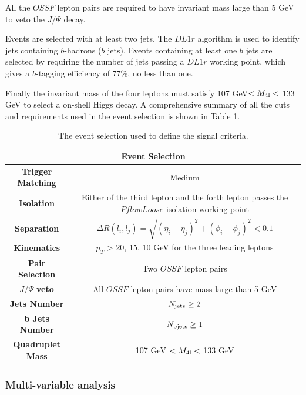 All the $OSSF$ lepton pairs are required to have invariant mass large than 5 GeV to veto the $J/\Psi$ decay.

Events are selected with at least two jets. The $DL1r$ algorithm is used to identify jets containing $b$-hadrons ($b$ jets). Events containing at least one $b$ jets are selected by requiring the number of jets passing a $DL1r$ working point, which gives a $b$-tagging efficiency of 77\%, no less than one.

Finally the invariant mass of the four leptons must satisfy 107 GeV$<M_{\rm 4l}<$ 133 GeV to select a on-shell Higgs decay. A comprehensive summary of all the cuts and requirements used in the event selection is shown in Table \ref{Tab.pre-selection}.

\begin{table}[H]
\begin{center}
\caption{The event selection used to define the signal criteria.}
\label{Tab.pre-selection}
\begin{tabular}{cc}
	\toprule
	\toprule	
	\multicolumn{2}{c}{\textbf{Event Selection}}\\
	\midrule
	\textbf{Trigger Matching}&Medium\\
	\midrule
	\textbf{Isolation}&\makecell[c]{Either of the third lepton and the forth lepton\\ passes the $PflowLoose$ isolation working point}\\
	\midrule
	\textbf{Separation}&$\Delta{R}(l_{i},l_{j})=\sqrt{(\eta_{i}-\eta_{j})^{2}+(\phi_{i}-\phi_{j})^{2}}<0.1$\\
	\midrule
	\textbf{Kinematics}&$p_{T}$ > 20, 15, 10 GeV for the three leading leptons\\
	\midrule
	\textbf{Pair Selection}&Two $OSSF$ lepton pairs\\
	\midrule
	\textbf{$J/\Psi$ veto}&All $OSSF$ lepton pairs have mass large than 5 GeV\\
	\midrule
	\textbf{Jets Number}&$N_{\rm jets}\ge{2}$\\
	\midrule
	\textbf{b Jets Number}&$N_{\rm b jets}\ge{1}$\\
	\midrule
	\textbf{Quadruplet Mass}&107 GeV $<M_{\rm 4l}<$ 133 GeV\\
	\bottomrule
	\bottomrule
\end{tabular}
\end{center}
\end{table}

\subsubsection{Multi-variable analysis}
\label{subsubsec:mva}

